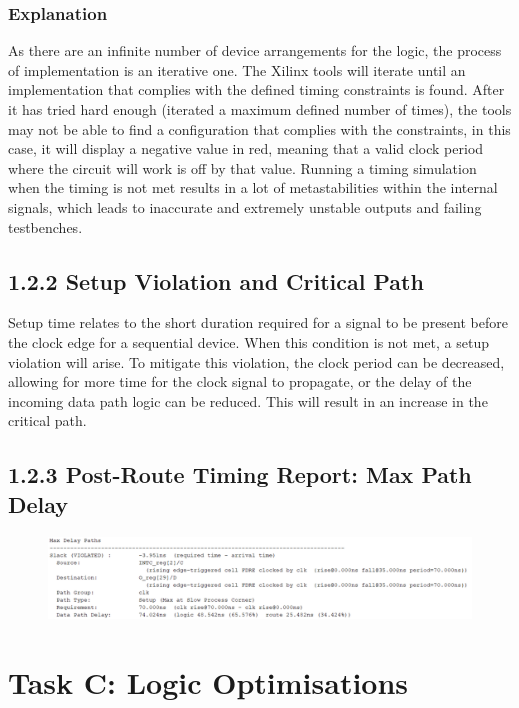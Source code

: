 \documentclass[11pt]{report}
\begin{document}
\subsection*{Explanation}
As there are an infinite number of device arrangements for the logic, the process of implementation is an iterative one. The Xilinx tools will iterate until an implementation that complies with the defined timing constraints is found. After it has tried hard enough (iterated a maximum defined number of times), the tools may not be able to find a configuration that complies with the constraints, in this case, it will display a negative value in red, meaning that a valid clock period where the circuit will work is off by that value. Running a timing simulation when the timing is not met results in a lot of metastabilities within the internal signals, which leads to inaccurate and extremely unstable outputs and failing testbenches.

\section*{1.2.2 Setup Violation and Critical Path}
Setup time relates to the short duration required for a signal to be present before the clock edge for a sequential device. When this condition is not met, a setup violation will arise. To mitigate this violation, the clock period can be decreased, allowing for more time for the clock signal to propagate, or the delay of the incoming data path logic can be reduced. This will result in an increase in the critical path.

\section*{1.2.3 Post-Route Timing Report: Max Path Delay}
\begin{figure}[H]
    \includegraphics[width=\columnwidth]{Reports/Lab2/Waveforms/1.2.3_max-path-delay.png}
\end{figure}


\chapter*{Task C: Logic Optimisations}
\end{document}
